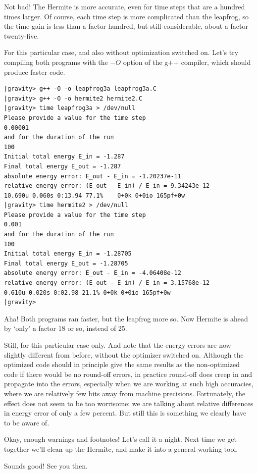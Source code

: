 \abc

\carol
Not bad!  The Hermite is more accurate, even for time steps that are a
hundred times larger.  Of course, each time step is more complicated
than the leapfrog, so the time gain is less than a factor hundred, but
still considerable, about a factor twenty-five.

\alice
For this particular case, and also without optimization switched on.
Let's try compiling both programs with the $-O$ option of the g++
compiler, which should produce faster code.

\cba

\begin{small}
\begin{verbatim}
|gravity> g++ -O -o leapfrog3a leapfrog3a.C
|gravity> g++ -O -o hermite2 hermite2.C
|gravity> time leapfrog3a > /dev/null
Please provide a value for the time step
0.00001
and for the duration of the run
100
Initial total energy E_in = -1.287
Final total energy E_out = -1.287
absolute energy error: E_out - E_in = -1.20237e-11
relative energy error: (E_out - E_in) / E_in = 9.34243e-12
10.690u 0.060s 0:13.94 77.1%	0+0k 0+0io 165pf+0w
|gravity> time hermite2 > /dev/null
Please provide a value for the time step
0.001
and for the duration of the run
100
Initial total energy E_in = -1.28705
Final total energy E_out = -1.28705
absolute energy error: E_out - E_in = -4.06408e-12
relative energy error: (E_out - E_in) / E_in = 3.15768e-12
0.610u 0.020s 0:02.98 21.1%	0+0k 0+0io 165pf+0w
|gravity> 
\end{verbatim}
\end{small}

\abc

\carol
Aha!  Both programs ran faster, but the leapfrog more so.  Now Hermite
is ahead by `only' a factor 18 or so, instead of 25.

\alice
Still, for this particular case only.  And note that the energy errors
are now slightly different from before, without the optimizer switched
on.  Although the optimized code should in principle give the same
results as the non-optimized code if there would be no round-off
errors, in practice round-off does creep in and propagate into the
errors, especially when we are working at such high accuracies, where
we are relatively few bits away from machine precisions.  Fortunately, 
the effect does not seem to be too worrisome: we are talking about
relative differences in energy error of only a few percent.  But still
this is something we clearly have to be aware of.

\bob
Okay, enough warnings and footnotes!  Let's call it a night.  Next
time we get together we'll clean up the Hermite, and make it into a
general working tool.

\carol
Sounds good!  See you then.

\cba
